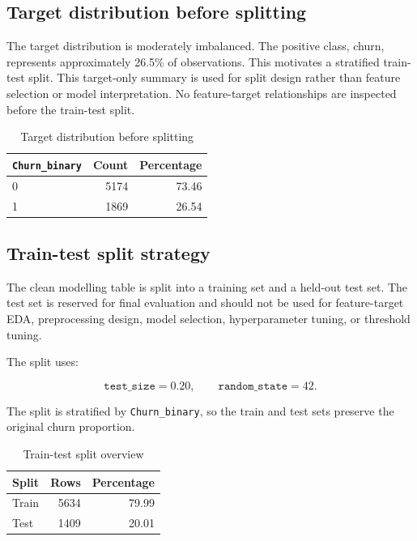 \subsection{Target distribution before splitting}

The target distribution is moderately imbalanced. The positive class, churn, represents approximately 26.5\% of observations. This motivates a stratified train-test split. This target-only summary is used for split design rather than feature selection or model interpretation. No feature-target relationships are inspected before the train-test split.

\begin{table}[H]
\centering
\caption{Target distribution before splitting}
\begin{tabular}{lrr}
\toprule
\texttt{Churn\_binary} & Count & Percentage \\
\midrule
0 & 5174 & 73.46 \\
1 & 1869 & 26.54 \\
\bottomrule
\end{tabular}
\end{table}

\subsection{Train-test split strategy}

The clean modelling table is split into a training set and a held-out test set. The test set is reserved for final evaluation and should not be used for feature-target EDA, preprocessing design, model selection, hyperparameter tuning, or threshold tuning.

The split uses:

\[
\texttt{test\_size} = 0.20,
\qquad
\texttt{random\_state} = 42.
\]

The split is stratified by \texttt{Churn\_binary}, so the train and test sets preserve the original churn proportion.

\begin{table}[H]
\centering
\caption{Train-test split overview}
\begin{tabular}{lrr}
\toprule
Split & Rows & Percentage \\
\midrule
Train & 5634 & 79.99 \\
Test & 1409 & 20.01 \\
\bottomrule
\end{tabular}
\end{table}


